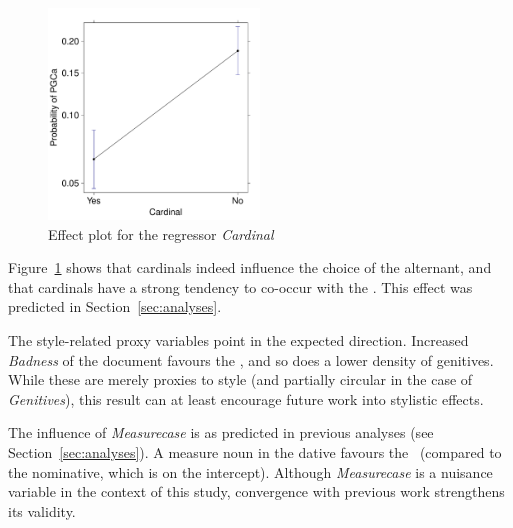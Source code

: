 \begin{figure}[h!]
  \centering
  \includegraphics[width=0.5\textwidth]{../R/output/corpus_Cardinal}
  \caption{Effect plot for the regressor \textit{Cardinal}}
  \label{fig:eff:leftcontext}
\end{figure}

Figure~\ref{fig:eff:leftcontext} shows that cardinals indeed influence the choice of the alternant, and that cardinals have a strong tendency to co-occur with the \NACa.
This effect was predicted in Section~\ref{sec:analyses}.

The style-related proxy variables point in the expected direction.
Increased \textit{Badness} of the document favours the \NACa, and so does a lower density of genitives.
While these are merely proxies to style (and partially circular in the case of \textit{Genitives}), this result can at least encourage future work into stylistic effects. 

The influence of \textit{Measurecase} is as predicted in previous analyses (see Section~\ref{sec:analyses}).
A measure noun in the dative favours the \PGCa\ (compared to the nominative, which is on the intercept).
Although \textit{Measurecase} is a nuisance variable in the context of this study, convergence with previous work strengthens its validity.

